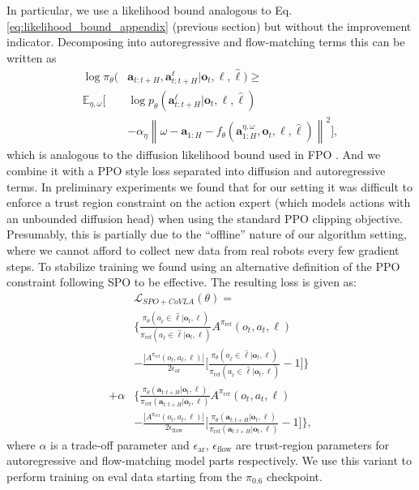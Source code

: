 \documentclass[conference]{IEEEtran}
\newcommand{\ba}{\mathbf{a}}
\newcommand{\bo}{\mathbf{o}}
\newcommand{\lang}{\ell}
\newcommand{\piref}{\pi_\text{ref}}
\newcommand{\rawtext}{\hat{\ell}} %
\def \Pizs {$\pi_{0.6}$}
\begin{document}
In particular, we use a likelihood bound analogous to Eq. \eqref{eq:likelihood_bound_appendix} (previous section) but without the improvement indicator. Decomposing into autoregressive and flow-matching terms this can be written as
\begin{equation}
\begin{aligned}
    \log \pi_\theta(&\ba_{t:t+H}, \ba^{\lang}_{t:t+H} \vert \bo_t, \lang, \hat{\ell}) \geq \\  \mathbb{E}_{\eta, \omega} \Big[&  \log p_\theta(\ba^{\lang}_{t:t+H} | \bo_t, \lang, \hat{\ell})
     \\ &- \alpha_\eta \left\|\omega - \ba_{1:H} - f_\theta(\ba^{\eta, \omega}_{1:H}, \bo_t, \lang, \hat{\ell})\right\|^2 \Big],
\end{aligned}
\end{equation}
which is analogous to the diffusion likelihood bound used in FPO \citep{mcallister2025fpo}. And we combine it with a PPO style loss separated into diffusion and autoregressive terms. In preliminary experiments we found that for our setting it was difficult to enforce a trust region constraint on the action expert (which models actions with an unbounded diffusion head) when using the standard PPO clipping objective. Presumably, this is partially due to the ``offline'' nature of our algorithm setting, where we cannot afford to collect new data from real robots every few gradient steps.
To stabilize training we found using an alternative definition of the PPO constraint following SPO \citep{xie2025simplepolicyoptimization} to be effective. The resulting loss is given as:
\begin{equation}
\begin{aligned}
&\mathcal{L}_{SPO+CoVLA}(\theta) =  \\  
&\Bigg\lbrace \frac{\pi_\theta( a_{\rawtext} \in \rawtext | \bo_t, \lang)}{\piref( a_{\rawtext} \in \rawtext | \bo_t, \lang)} A^{\piref}(o_t, a_t, \lang) \\
&- \frac{|A^{\piref}(o_t, a_t, \lang)|}{2\epsilon_{\text{ar}}} \Bigg[\frac{\pi_\theta( a_{\rawtext} \in \rawtext | \bo_t, \lang)}{\piref( a_{\rawtext} \in \rawtext | \bo_t, \lang)} - 1 \Bigg] \Bigg\rbrace \\
+ \alpha &\Bigg\lbrace \frac{\pi_\theta(\ba_{t:t+H} \vert \bo_t, \lang)}{\piref(\ba_{t:t+H} \vert \bo_t, \lang)} A^{\piref}(o_t, a_t, \lang) \\
&- \frac{|A^{\piref}(o_t, a_t, \lang)|}{2\epsilon_{\text{flow}}} \Bigg[\frac{\pi_\theta(\ba_{t:t+H} \vert \bo_t, \lang)}{\piref(\ba_{t:t+H} \vert \bo_t, \lang)}  - 1 \Bigg] \Bigg\rbrace,
\end{aligned}
\end{equation}
where $\alpha$ is a trade-off parameter and $\epsilon_{\text{ar}}$, $\epsilon_{\text{flow}}$ are trust-region parameters for autoregressive and flow-matching model parts respectively.
We use this variant to perform training on eval data starting from the \Pizs{}{} checkpoint.
\end{document}
